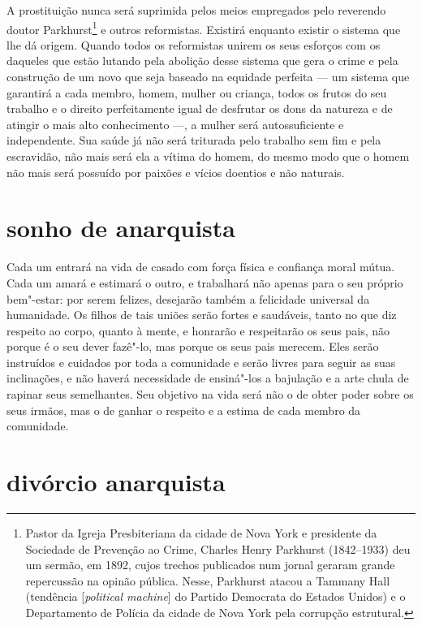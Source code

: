 A prostituição nunca será suprimida pelos meios empregados pelo
reverendo doutor Parkhurst\footnote{Pastor da Igreja Presbiteriana da cidade de Nova York e presidente da Sociedade de Prevenção ao Crime, Charles Henry Parkhurst (1842--1933) deu um sermão, em 1892, cujos trechos publicados num jornal geraram grande repercussão na opinão pública. Nesse, Parkhurst atacou a Tammany Hall (tendência [\textit{political machine}] do Partido Democrata do Estados Unidos) e o Departamento de Polícia da cidade de Nova York pela corrupção estrutural.} e outros reformistas. Existirá enquanto
existir o sistema que lhe dá origem. Quando todos os reformistas
unirem os seus esforços com os daqueles que estão lutando pela abolição desse sistema
que gera o crime e pela construção de um novo que seja baseado na
equidade perfeita --- um sistema que garantirá a cada membro, homem,
mulher ou criança, todos os frutos do seu trabalho e o direito
perfeitamente igual de desfrutar os dons da natureza e de atingir o
mais alto conhecimento ---, a mulher será autossuficiente e independente.
Sua saúde já não será triturada pelo trabalho sem fim e pela escravidão,
não mais será ela a vítima do homem, do mesmo modo que o homem não mais
será possuído por paixões e vícios doentios e não naturais.

\section{sonho de anarquista}

Cada um entrará na vida de casado com força física e confiança moral
mútua. Cada um amará e estimará o outro, e trabalhará não apenas para o
seu próprio bem"-estar: por serem felizes, desejarão também a felicidade
universal da humanidade. Os filhos de tais uniões serão fortes e
saudáveis, tanto no que diz respeito ao corpo, quanto à mente, e
honrarão e respeitarão os seus pais, não porque é o seu dever fazê"-lo,
mas porque os seus pais merecem. Eles serão instruídos e cuidados por
toda a comunidade e serão livres para seguir as suas inclinações, e não
haverá necessidade de ensiná"-los a bajulação e a arte chula de rapinar
seus semelhantes. Seu objetivo na vida será não o de obter poder sobre
os seus irmãos, mas o de ganhar o respeito e a estima de cada membro da
comunidade.

\section{divórcio anarquista}

